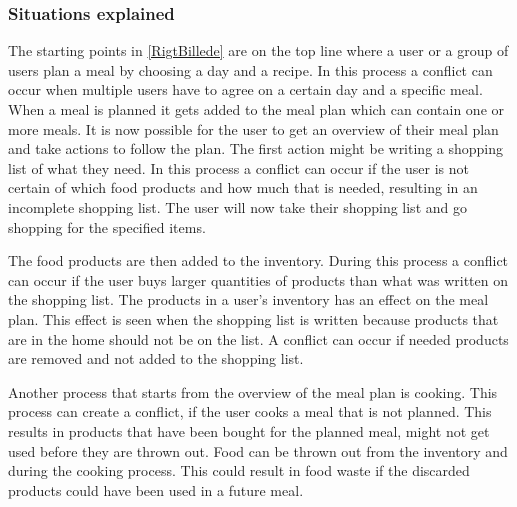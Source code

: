 \subsubsection{Situations explained}
The starting points in \cref{RigtBillede} are on the top line where a user or a group of users plan a meal by choosing a day and a recipe. In this process a conflict can occur when multiple users have to agree on a certain day and a specific meal. When a meal is planned it gets added to the meal plan which can contain one or more meals. It is now possible for the user to get an overview of their meal plan and take actions to follow the plan. The first action might be writing a shopping list of what they need. In this process a conflict can occur if the user is not certain of which food products and how much that is needed, resulting in an incomplete shopping list. The user will now take their shopping list and go shopping for the specified items. 

The food products are then added to the inventory. During this process a conflict can occur if the user buys larger quantities of products than what was written on the shopping list. The products in a user's inventory has an effect on the meal plan. This effect is seen when the shopping list is written because products that are in the home should not be on the list. A conflict can occur if needed products are removed and not added to the shopping list. 

Another process that starts from the overview of the meal plan is cooking. This process can create a conflict, if the user cooks a meal that is not planned. This results in products that have been bought for the planned meal, might not get used before they are thrown out. Food can be thrown out from the inventory and during the cooking process. This could result in food waste if the discarded products could have been used in a future meal.

